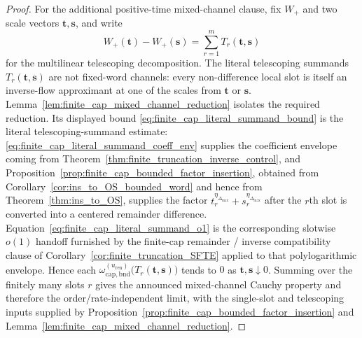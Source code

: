 \begin{proof}
For the additional positive-time mixed-channel clause, fix $W_+$ and two scale vectors $\mathbf t,\mathbf s$, and write
\[
W_+(\mathbf t)-W_+(\mathbf s)=\sum_{r=1}^m T_r(\mathbf t,\mathbf s)
\]
for the multilinear telescoping decomposition.
The literal telescoping summands $T_r(\mathbf t,\mathbf s)$ are not fixed-word channels: every non-difference local slot is itself an inverse-flow approximant at one of the scales from $\mathbf t$ or $\mathbf s$.
Lemma~\ref{lem:finite_cap_mixed_channel_reduction} isolates the required reduction.
Its displayed bound \eqref{eq:finite_cap_literal_summand_bound} is the literal telescoping-summand estimate: \eqref{eq:finite_cap_literal_summand_coeff_env} supplies the coefficient envelope coming from Theorem~\ref{thm:finite_truncation_inverse_control}, and Proposition~\ref{prop:finite_cap_bounded_factor_insertion}, obtained from Corollary~\ref{cor:ins_to_OS_bounded_word} and hence from Theorem~\ref{thm:ins_to_OS}, supplies the factor $t_r^{\eta_{\Delta_{\max}}}+s_r^{\eta_{\Delta_{\max}}}$ after the $r$th slot is converted into a centered remainder difference.
Equation~\eqref{eq:finite_cap_literal_summand_o1} is the corresponding slotwise $o(1)$ handoff furnished by the finite-cap remainder / inverse compatibility clause of Corollary~\ref{cor:finite_truncation_SFTE} applied to that polylogarithmic envelope.
Hence each
$\omega_{\mathrm{cap,bnd}}^{(u_{\mathrm{ren}})}\bigl(T_r(\mathbf t,\mathbf s)\bigr)$ tends to $0$ as $\mathbf t,\mathbf s\downarrow 0$.
Summing over the finitely many slots $r$ gives the announced mixed-channel Cauchy property and therefore the order/rate-independent limit, with the single-slot and telescoping inputs supplied by Proposition~\ref{prop:finite_cap_bounded_factor_insertion} and Lemma~\ref{lem:finite_cap_mixed_channel_reduction}.
\end{proof}

